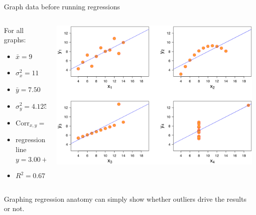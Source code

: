 \documentclass{beamer}
\begin{document}
\begin{frame}{Graph data before running regressions} 
\begin{columns}
\begin{column}{0.4\linewidth}
For all graphs:
\begin{itemize}
\item $\bar{x}=9$	
\item $\sigma^2_x=11$
\item $\bar{y}=7.50$
\item $\sigma^2_y=4.125$
\item $\text{Corr}_{x,y}=0.816$
\item regression line $y=3.00+0.500x$
\item $R^2= 0.67$
\end{itemize}
\end{column}
\begin{column}{0.6\linewidth}
\includegraphics[width=\linewidth]{./Figures/Anscombe}
\end{column}
\end{columns}\pause
Graphing regression anatomy can simply show whether outliers drive the results or not.




\end{frame}
\end{document}
